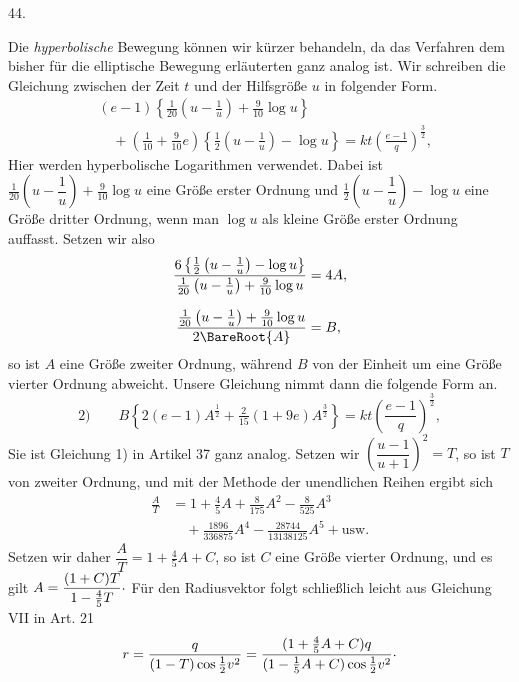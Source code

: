 \par{}
\begin{center}
\hypertarget{native-061-article044}{}44.
\end{center}
Die \emph{hyperbolische} Bewegung können wir kürzer behandeln, da das Verfahren dem bisher für die elliptische Bewegung erläuterten ganz analog ist. Wir schreiben die Gleichung zwischen der Zeit $t$ und der Hilfsgröße $u$ in folgender Form.
\[
\begin{aligned}
&(e-1)\left\{\tfrac{1}{20}\left(u-\frac{1}{u}\right)+\tfrac{9}{10}\log u\right\}\\
&\quad+\left(\tfrac{1}{10}+\tfrac{9}{10}e\right)\left\{\tfrac{1}{2}\left(u-\frac{1}{u}\right)-\log u\right\}=kt\left(\frac{e-1}{q}\right)^{\frac{3}{2}},
\end{aligned}
\]
\noindent Hier werden hyperbolische Logarithmen verwendet. Dabei ist $\tfrac{1}{20}\left(u-\dfrac{1}{u}\right)+\tfrac{9}{10}\log u$ eine Größe erster Ordnung und $\tfrac{1}{2}\left(u-\dfrac{1}{u}\right)-\log u$ eine Größe dritter Ordnung, wenn man $\log u$ als kleine Größe erster Ordnung auffasst. Setzen wir also
\[
\begin{aligned}
\frac{6\left\{\tfrac{1}{2}\left(u-\frac{1}{u}\right)-\log u\right\}}{\tfrac{1}{20}\left(u-\frac{1}{u}\right)+\tfrac{9}{10}\log u}&=4A,\\[.7em]
\frac{\tfrac{1}{20}\left(u-\frac{1}{u}\right)+\tfrac{9}{10}\log u}{2\BareRoot{A}}&=B,
\end{aligned}
\]
\noindent{}so ist $A$ eine Größe zweiter Ordnung, während $B$ von der Einheit um eine Größe vierter Ordnung abweicht. Unsere Gleichung nimmt dann die folgende Form an.
\[
\text{2)}\qquad B\left\{2(e-1)A^{\frac{1}{2}}+\tfrac{2}{15}(1+9e)A^{\frac{3}{2}}\right\}=kt\left(\frac{e-1}{q}\right)^{\frac{3}{2}},
\]
\noindent Sie ist Gleichung 1) in Artikel 37 ganz analog. Setzen wir $\left(\dfrac{u-1}{u+1}\right)^2=T$, so ist $T$ von zweiter Ordnung, und mit der Methode der unendlichen Reihen ergibt sich
\[
\begin{aligned}
\frac{A}{T}&=1+\tfrac{4}{5}A+\tfrac{8}{175}A^2-\tfrac{8}{525}A^3\\
&\quad+\tfrac{1896}{336875}A^4-\tfrac{28744}{13138125}A^5+\text{usw.}
\end{aligned}
\]
\noindent Setzen wir daher $\dfrac{A}{T}=1+\tfrac{4}{5}A+C$, so ist $C$ eine Größe vierter Ordnung, und es gilt $A=\dfrac{(1+C)T}{1-\tfrac{4}{5}T}\mathord{\raisebox{.35ex}{.}}$ Für den Radiusvektor folgt schließlich leicht aus Gleichung VII in Art. 21
\[
r=\frac{q}{(1-T)\cos\tfrac{1}{2}v^2}=\frac{(1+\tfrac{4}{5}A+C)q}{(1-\tfrac{1}{5}A+C)\cos\tfrac{1}{2}v^2}\mathord{\raisebox{.35ex}{.}}
\]

